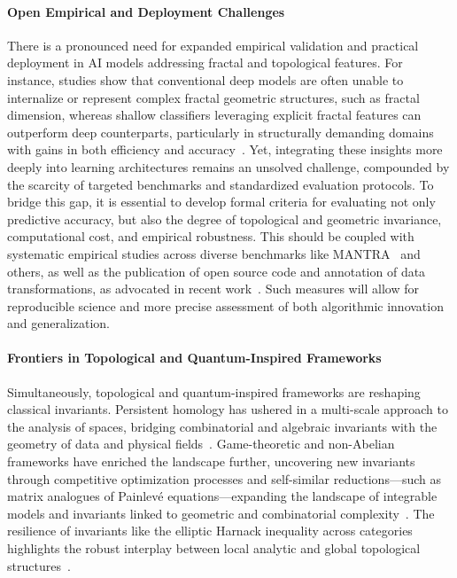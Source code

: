 \documentclass[sigconf]{acmart}
\begin{document}
\paragraph{Open Empirical and Deployment Challenges} 
There is a pronounced need for expanded empirical validation and practical deployment in AI models addressing fractal and topological features. For instance, studies show that conventional deep models are often unable to internalize or represent complex fractal geometric structures, such as fractal dimension, whereas shallow classifiers leveraging explicit fractal features can outperform deep counterparts, particularly in structurally demanding domains with gains in both efficiency and accuracy~\cite{ref39,ref54}. Yet, integrating these insights more deeply into learning architectures remains an unsolved challenge, compounded by the scarcity of targeted benchmarks and standardized evaluation protocols. To bridge this gap, it is essential to develop formal criteria for evaluating not only predictive accuracy, but also the degree of topological and geometric invariance, computational cost, and empirical robustness. This should be coupled with systematic empirical studies across diverse benchmarks like MANTRA~\cite{ref26} and others, as well as the publication of open source code and annotation of data transformations, as advocated in recent work~\cite{ref65}. Such measures will allow for reproducible science and more precise assessment of both algorithmic innovation and generalization.

\paragraph{Frontiers in Topological and Quantum-Inspired Frameworks}
Simultaneously, topological and quantum-inspired frameworks are reshaping classical invariants. Persistent homology has ushered in a multi-scale approach to the analysis of spaces, bridging combinatorial and algebraic invariants with the geometry of data and physical fields~\cite{ref62}. Game-theoretic and non-Abelian frameworks have enriched the landscape further, uncovering new invariants through competitive optimization processes and self-similar reductions—such as matrix analogues of Painlevé equations—expanding the landscape of integrable models and invariants linked to geometric and combinatorial complexity~\cite{ref55,ref63}. The resilience of invariants like the elliptic Harnack inequality across categories highlights the robust interplay between local analytic and global topological structures~\cite{ref40}.
\end{document}
